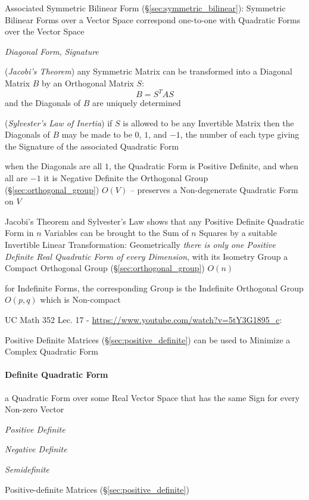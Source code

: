 Associated Symmetric Bilinear Form (\S\ref{sec:symmetric_bilinear}): Symmetric
Bilinear Forms over a Vector Space correspond one-to-one with Quadratic Forms
over the Vector Space

\emph{Diagonal Form}, \emph{Signature}

(\emph{Jacobi's Theorem}) any Symmetric Matrix can be transformed into a
Diagonal Matrix $B$ by an Orthogonal Matrix $S$:
\[
  B = S^T A S
\]
and the Diagonals of $B$ are uniquely determined

(\emph{Sylvester's Law of Inertia}) if $S$ is allowed to be any Invertible
Matrix then the Diagonals of $B$ may be made to be $0$, $1$, and $-1$, the
number of each type giving the Signature of the associated Quadratic Form

when the Diagonals are all $1$, the Quadratic Form is Positive Definite, and
when all are $-1$ it is Negative Definite
the Orthogonal Group (\S\ref{sec:orthogonal_group}) $O(V)$ -- preserves a
Non-degenerate Quadratic Form on $V$

Jacobi's Theorem and Sylvester's Law shows that any Positive Definite Quadratic
Form in $n$ Variables can be brought to the Sum of $n$ Squares by a suitable
Invertible Linear Transformation: Geometrically \emph{there is only one
  Positive Definite Real Quadratic Form of every Dimension}, with its Isometry
Group a Compact Orthogonal Group (\S\ref{sec:orthogonal_group}) $O(n)$

for Indefinite Forms, the corresponding Group is the Indefinite Orthogonal
Group $O(p,q)$ which is Non-compact


UC Math 352 Lec. 17 - \url{https://www.youtube.com/watch?v=5tY3G1895_c}:

Positive Definite Matrices (\S\ref{sec:positive_definite}) can be used to
Minimize a Complex Quadratic Form



\paragraph{Definite Quadratic Form}\label{sec:definite_quadratic}\hfill

a Quadratic Form over some Real Vector Space that has the same Sign
for every Non-zero Vector

\emph{Positive Definite}

\emph{Negative Definite}

\emph{Semidefinite}

\fist Positive-definite Matrices (\S\ref{sec:positive_definite})


